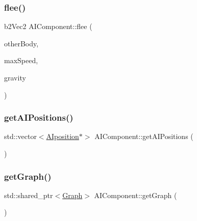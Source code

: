 \mbox{\label{classAIComponent_adc2c03c2bd20fd66ed26580e2b8d2784}} 
\subsubsection{\texorpdfstring{flee()}{flee()}}
{\footnotesize\ttfamily b2\+Vec2 A\+I\+Component\+::flee (\begin{DoxyParamCaption}\item[{b2\+Body $\ast$}]{other\+Body,  }\item[{float}]{max\+Speed,  }\item[{float}]{gravity }\end{DoxyParamCaption})}

\mbox{\label{classAIComponent_a8bc910076abb3723183b92fa8d317049}} 
\subsubsection{\texorpdfstring{get\+A\+I\+Positions()}{getAIPositions()}}
{\footnotesize\ttfamily std\+::vector$<$\hyperlink{structAIposition}{A\+Iposition}$\ast$$>$ A\+I\+Component\+::get\+A\+I\+Positions (\begin{DoxyParamCaption}{ }\end{DoxyParamCaption})\hspace{0.3cm}{\ttfamily [inline]}}

\mbox{\label{classAIComponent_aeddece3b6c4aac54c401fb3ebeb657ba}} 
\subsubsection{\texorpdfstring{get\+Graph()}{getGraph()}}
{\footnotesize\ttfamily std\+::shared\+\_\+ptr$<$\hyperlink{classGraph}{Graph}$>$ A\+I\+Component\+::get\+Graph (\begin{DoxyParamCaption}{ }\end{DoxyParamCaption})\hspace{0.3cm}{\ttfamily [inline]}}

